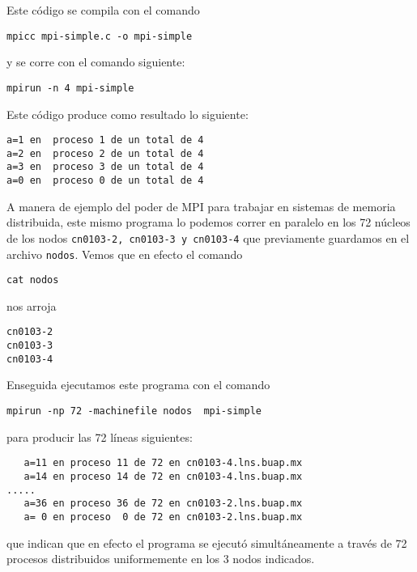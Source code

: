 \documentclass[letter]{jpconf}
\begin{document}
Este c\'odigo se compila con el comando
\color{blue}
\begin{verbatim}
mpicc mpi-simple.c -o mpi-simple
\end{verbatim}
\color{black}
y se corre con el comando siguiente:
\color{blue}
\begin{verbatim}
mpirun -n 4 mpi-simple
\end{verbatim}
\color{black}
Este c\'odigo produce como resultado lo siguiente:
\color{brown}
\begin{verbatim}
a=1 en  proceso 1 de un total de 4
a=2 en  proceso 2 de un total de 4
a=3 en  proceso 3 de un total de 4
a=0 en  proceso 0 de un total de 4
\end{verbatim}
\color{black}

A manera de ejemplo del poder de MPI para trabajar en sistemas de memoria distribuida, este mismo programa lo podemos correr en paralelo en los 72 n\'ucleos de los nodos 
 \texttt{cn0103-2, cn0103-3 y cn0103-4} que previamente guardamos en el archivo  \texttt{nodos}. Vemos que en efecto el comando
\color{blue}
\begin{verbatim}
cat nodos
\end{verbatim}
\color{black}
nos arroja
\color{brown}
\begin{verbatim}
cn0103-2 
cn0103-3 
cn0103-4
\end{verbatim}
\color{black}
Enseguida ejecutamos este programa con el comando
\color{blue}
\begin{verbatim}
mpirun -np 72 -machinefile nodos  mpi-simple
\end{verbatim}
\color{black}
para producir las 72 l\'ineas siguientes:
\color{brown}
\begin{verbatim}
   a=11 en proceso 11 de 72 en cn0103-4.lns.buap.mx
   a=14 en proceso 14 de 72 en cn0103-4.lns.buap.mx
.....
   a=36 en proceso 36 de 72 en cn0103-2.lns.buap.mx
   a= 0 en proceso  0 de 72 en cn0103-2.lns.buap.mx
\end{verbatim}
\color{black}
que indican que en efecto el programa se ejecut\'o simult\'aneamente a trav\'es de 72 procesos distribuidos uniformemente en los 3 nodos indicados. 
\end{document}
